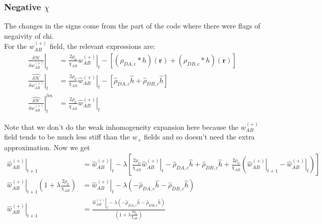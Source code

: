 \documentclass{article}
\begin{document}
    \subsubsection{Negative $\chi$}
    The changes in the signs come from the part of the code where there were flags of negaivity of chi. \\
    For the $w_{AB}^{(+)}$ field, the relevant expressions are:
  \begin{align*}
    \left. \frac{\delta \mathcal{H}}{\delta  w_{AB}^{(+)} } \right|_t &=
      \frac{2\rho_0}{\chi_{AB}} \left. w_{AB}^{(+)} \right|_t
      -   [ (\rho_{DA,c} \ast h)(\mathbf{r})
            + (\rho_{DB,c} \ast h)(\mathbf{r}) ] \\
      \left. \hat{\frac{\delta \mathcal{H}}{\delta w_{AB}^{(+)}}} \right|_t &=
      \frac{2\rho_0}{\chi_{AB}} \left. \hat{w}_{AB}^{(+)} \right|_t
      -   [ \hat{\rho}_{DA,c} \hat{h}
            + \hat{\rho}_{DB,c} \hat{h} ] 
            \\
            \left.
            \hat{\frac{\delta \mathcal{H}}{\delta w_{AB}^{(+)}}}
            \right| ^{lin}_t &=
            \frac{2\rho_0}{\chi_{AB}} \left. \hat{w}_{AB}^{(+)} \right|_t
  \end{align*}
  
    Note that we don't do the weak inhomogeneity expansion here because the
  $w_{AB}^{(+)}$ field tends to be much less stiff than the $w_+$ fields and so
  doesn't need the extra approximation.
  Now we get
  \begin{align*}
  \left. \hat{w}_{AB}^{(+)} \right|_{t+1} &=
  \left. \hat{w}_{AB}^{(+)} \right|_t - \lambda \left[
  \frac{2\rho_0}{\chi_{AB}} \left. \hat{w}_{AB}^{(+)} \right|_t
  - \hat{\rho}_{DA,c} \hat{h}
  + \hat{\rho}_{DB,c} \hat{h}
  + \frac{2\rho_0}{\chi_{AB}}
  ( \left. \hat{w}_{AB}^{(+)}\right|_{t+1}
  - \left. \hat{w}_{AB}^{(+)} \right|_t
  )
  \right] \\
  \left. \hat{w}_{AB}^{(+)} \right|_{t+1} ( 1 + \lambda \frac{2
  	\rho_0}{\chi_{AB}} ) &=
  \left. \hat{w}_{AB}^{(+)} \right|_t - \lambda \left(
  - \hat{\rho}_{DA,c} \hat{h}
  - \hat{\rho}_{DB,c} \hat{h}
  \right) \\
  \left. \hat{w}_{AB}^{(+)} \right|_{t+1} &=
  \frac{
  	\left. \hat{w}_{AB}^{(+)} \right|_t - \lambda \left(
  	- \hat{\rho}_{DA,c} \hat{h}
  	- \hat{\rho}_{DB,c} \hat{h}
  	\right)
  }
  {
  	\left( 1 + \lambda \frac{2 \rho_0}{\chi_{AB}} \right)
  }
  \end{align*}
  
\end{document}
